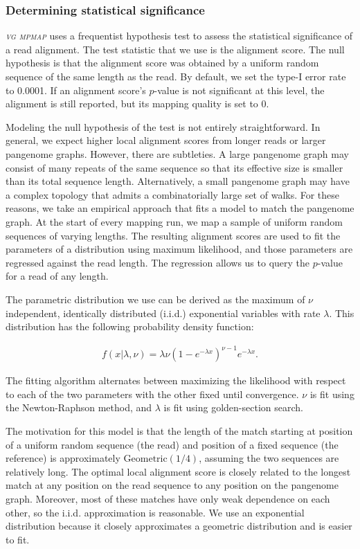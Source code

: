 \documentclass[11pt]{ucthesis}
\newcommand{\tool}[1]{\emph{\textsc{#1}}}
\begin{document}
\subsubsection{Determining statistical significance}

\tool{vg mpmap} uses a frequentist hypothesis test to assess the statistical significance of a read alignment. The test statistic that we use is the alignment score. The null hypothesis is that the alignment score was obtained by a uniform random sequence of the same length as the read. By default, we set the type-I error rate to 0.0001. If an alignment score's $p$-value is not significant at this level, the alignment is still reported, but its mapping quality is set to 0.

Modeling the null hypothesis of the test is not entirely straightforward. In general, we expect higher local alignment scores from longer reads or larger pangenome graphs. However, there are subtleties. A large pangenome graph may consist of many repeats of the same sequence so that its effective size is smaller than its total sequence length. Alternatively, a small pangenome graph may have a complex topology that admits a combinatorially large set of walks. For these reasons, we take an empirical approach that fits a model to match the pangenome graph. At the start of every mapping run, we map a sample of uniform random sequences of varying lengths. The resulting alignment scores are used to fit the parameters of a distribution using maximum likelihood, and those parameters are regressed against the read length. The regression allows us to query the $p$-value for a read of any length.

The parametric distribution we use can be derived as the maximum of $\nu$ independent, identically distributed (i.i.d.) exponential variables with rate $\lambda$. This distribution has the following probability density function:

\begin{align}
    f(x|\lambda, \nu) = \lambda \nu (1 - e^{-\lambda x})^{\nu - 1} e^{-\lambda x}.
\end{align}

The fitting algorithm alternates between maximizing the likelihood with respect to each of the two parameters with the other fixed until convergence. $\nu$ is fit using the Newton-Raphson method, and $\lambda$ is fit using golden-section search.

The motivation for this model is that the length of the match starting at position  of a uniform random sequence (the read) and position  of a fixed sequence (the reference) is approximately ${\mathrm{Geometric}(1/4)}$, assuming the two sequences are relatively long. The optimal local alignment score is closely related to the longest match at any position on the read sequence to any position on the pangenome graph. Moreover, most of these matches have only weak dependence on each other, so the i.i.d. approximation is reasonable. We use an exponential distribution because it closely approximates a geometric distribution and is easier to fit. 
\end{document}
